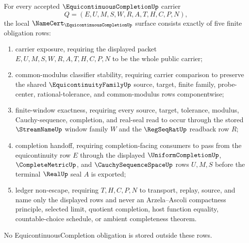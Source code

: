 \begin{theorem}
\label{thm:equicontinuous-completion-namecert-obligation-surface}
For every accepted $\EquicontinuousCompletionUp$ carrier
$$
Q=(E,U,M,S,W,R,A,T,H,C,P,N),
$$
the local $\NameCert_{\EquicontinuousCompletionUp}$ surface consists exactly
of five finite obligation rows:
\begin{enumerate}
\item carrier exposure, requiring the displayed packet
$E,U,M,S,W,R,A,T,H,C,P,N$ to be the whole public carrier;
\item common-modulus classifier stability, requiring carrier comparison to
preserve the shared $\EquicontinuityFamilyUp$ source, target, finite family,
probe-center, rational-tolerance, and common-modulus rows componentwise;
\item finite-window exactness, requiring every source, target, tolerance,
modulus, Cauchy-sequence, completion, and real-seal read to occur through the
stored $\StreamNameUp$ window family $W$ and the $\RegSeqRatUp$ readback row
$R$;
\item completion handoff, requiring completion-facing consumers to pass from
the equicontinuity row $E$ through the displayed $\UniformCompletionUp$,
$\CompleteMetricUp$, and $\CauchySequenceSpaceUp$ rows $U,M,S$ before the
terminal $\RealUp$ seal $A$ is exported;
\item ledger non-escape, requiring $T,H,C,P,N$ to transport, replay, source,
and name only the displayed rows and never an Arzela--Ascoli compactness
principle, selected limit, quotient completion, host function equality,
countable-choice schedule, or ambient completeness theorem.
\end{enumerate}
No EquicontinuousCompletion obligation is stored outside these rows.
\end{theorem}
